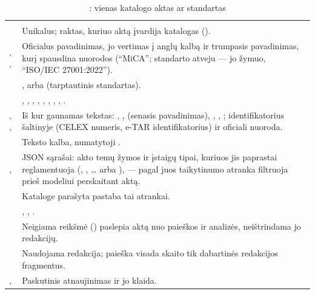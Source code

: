 \begin{xltabular}{\textwidth}{@{}L{38mm}Y@{}}
\caption{: vienas katalogo aktas ar standartas}\label{tab:data:ld}\\
\toprule
{} &  \\
\midrule
\endfirsthead
\toprule
{} &  \\
\midrule
\endhead
\bottomrule
\endlastfoot
{} & Unikalus; raktas, kuriuo aktą įvardija katalogas (). \\
, ,  & Oficialus pavadinimas, jo vertimas į anglų kalbą ir trumpasis pavadinimas, kurį spausdina nuorodos (\enquote{MiCA}; standarto atveju --- jo žymuo, \enquote{ISO/IEC 27001:2022}). \\
 & ,  arba  (tarptautinis standartas). \\
 & , , , , , , , , . \\
, ,  & Iš kur gaunamas tekstas: , ,  (senasis  pavadinimas), , , ; identifikatorius šaltinyje (CELEX numeris, e-TAR identifikatorius) ir oficiali nuoroda. \\
 & Teksto kalba, numatytoji . \\
,  & JSON sąrašai: akto temų žymos ir įstaigų tipai, kuriuos jis paprastai reglamentuoja (, , \dots{} arba ), --- pagal juos taikytinumo atranka filtruoja prieš modeliui perskaitant aktą. \\
 & Kataloge parašyta pastaba tai atrankai. \\
 & , , . \\
 & Neigiama reikšmė () paslepia aktą nuo paieškos ir analizės, neištrindama jo redakcijų. \\
 & Naudojama redakcija; paieška visada skaito tik dabartinės redakcijos fragmentus. \\
,  & Paskutinis atnaujinimas ir jo klaida. \\
\end{xltabular}

